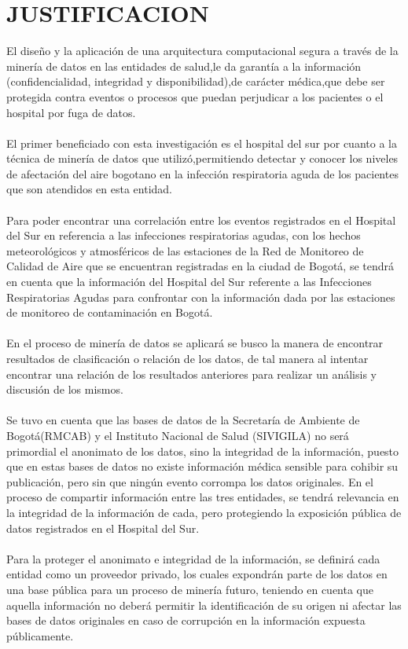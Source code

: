 \documentclass[a4paper,openright,12pt]{book}
\theoremstyle{definition}
\theoremstyle{remark}
\begin{document}
\section{JUSTIFICACION}
El diseño y la aplicación de una arquitectura computacional segura a través de la minería de datos en las entidades de salud,le da garantía a la información (confidencialidad, integridad y disponibilidad),de carácter médica,que debe ser protegida contra eventos o procesos que puedan perjudicar a los pacientes o el hospital por fuga de datos.\\\\
El primer beneficiado con esta investigación es el hospital del sur por cuanto a la técnica de minería de datos que utilizó,permitiendo detectar y conocer los niveles de afectación del aire bogotano en la infección respiratoria aguda de los pacientes que son atendidos en esta entidad.\\\\
Para  poder encontrar una correlación entre los eventos registrados en el Hospital del Sur en referencia a las infecciones respiratorias agudas, con los hechos meteorológicos y atmosféricos de las estaciones de la Red de Monitoreo de Calidad de Aire que se encuentran registradas en la ciudad de Bogotá, se tendrá en cuenta que la información del Hospital del Sur referente a las Infecciones Respiratorias Agudas para confrontar con la información dada por las estaciones de monitoreo de contaminación en Bogotá.\\\\
En el proceso de minería de datos se aplicará se busco la manera de encontrar resultados de clasificación o relación de los datos, de tal manera al intentar encontrar una relación de los resultados anteriores para realizar un análisis y discusión de los mismos.\\\\
Se tuvo en cuenta que las bases de datos de la Secretaría de Ambiente de Bogotá(RMCAB) y el Instituto Nacional de Salud (SIVIGILA) no será primordial el anonimato de los datos, sino la integridad de la información, puesto que en estas bases de datos no existe información médica sensible para cohibir su publicación, pero sin que ningún evento corrompa los datos originales. En el proceso de compartir información entre las tres entidades, se tendrá relevancia en la integridad de la información de cada, pero protegiendo la exposición pública de datos registrados en el Hospital del Sur.\\\\
Para la proteger el anonimato e integridad de la información, se definirá cada entidad como un proveedor privado, los cuales expondrán parte de los datos en una base pública para un proceso de minería futuro, teniendo en cuenta que aquella información no deberá permitir la identificación de su origen ni afectar las bases de datos originales en caso de corrupción en la información expuesta públicamente.\\\\
\end{document}
